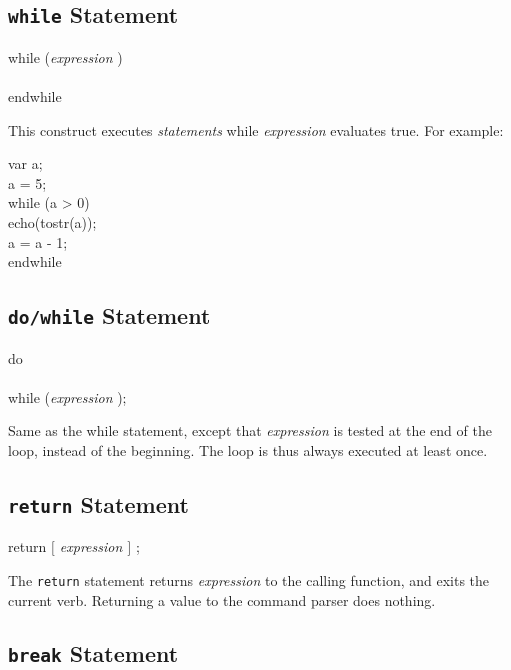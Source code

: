 \subsection{{\tt while} Statement}

\begin{code}
while ({\em expression} ) \\
 \\
endwhile
\end{code}

This construct executes {\em statements } while {\em expression }
evaluates true.  For example:

\begin{code}
var	a; \\
a = 5; \\
while (a > 0) \\
\ind echo(tostr(a)); \\
\ind a = a - 1; \\
endwhile
\end{code}

\subsection{{\tt do/while} Statement}

\begin{code}
do \\
 \\
while ({\em expression });
\end{code}

Same as the while statement, except that {\em expression } is tested at
the end of the loop, instead of the beginning.  The loop is thus always
executed at least once.

\subsection{{\tt return} Statement}

\begin{code}
return {\em $[$ expression $]$ } ;
\end{code}

The {\tt return} statement returns {\em expression } to the calling
function, and exits the current verb.  Returning a value to the command
parser does nothing.

\subsection{{\tt break} Statement}

